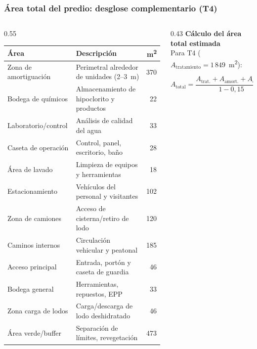 \documentclass[aspectratio=169]{beamer}
\begin{document}
\begin{frame}
\frametitle{\'{A}rea total del predio: desglose complementario (T4)}
\begin{columns}[T]
\begin{column}{0.55\textwidth}
\scriptsize
\renewcommand{\arraystretch}{1.0}
\begin{tabular}{p{3.4cm}p{3.4cm}r}
\toprule
\textbf{\'{A}rea} & \textbf{Descripci\'{o}n} & \textbf{m\textsuperscript{2}} \\
\midrule
Zona de amortiguaci\'{o}n & Perimetral alrededor de unidades (2--3~m) & 370 \\
Bodega de qu\'{i}micos & Almacenamiento de hipoclorito y productos & 22 \\
Laboratorio/control & An\'{a}lisis de calidad del agua & 33 \\
Caseta de operaci\'{o}n & Control, panel, escritorio, ba\~{n}o & 28 \\
\'{A}rea de lavado & Limpieza de equipos y herramientas & 18 \\
Estacionamiento & Veh\'{i}culos del personal y visitantes & 102 \\
Zona de camiones & Acceso de cisterna/retiro de lodo & 120 \\
Caminos internos & Circulaci\'{o}n vehicular y peatonal & 185 \\
Acceso principal & Entrada, port\'{o}n y caseta de guardia & 46 \\
Bodega general & Herramientas, repuestos, EPP & 33 \\
Zona carga de lodos & Carga/descarga de lodo deshidratado & 46 \\
\'{A}rea verde/buffer & Separaci\'{o}n de l\'{i}mites, revegetaci\'{o}n & 473 \\
\bottomrule
\end{tabular}
\end{column}
\begin{column}{0.43\textwidth}
\footnotesize
\textbf{C\'{a}lculo del \'{a}rea total estimada}\\[4pt]
\scriptsize
Para T4 ($A_{\text{tratamiento}} = 1\,849$~m\textsuperscript{2}):

\vspace{6pt}
\[
A_{\text{total}} = \frac{A_{\text{trat.}} + A_{\text{amort.}} + A_{\text{compl.}}}{1 - 0{,}15}
\]


\end{column}
\end{columns}
\end{frame}
\end{document}
